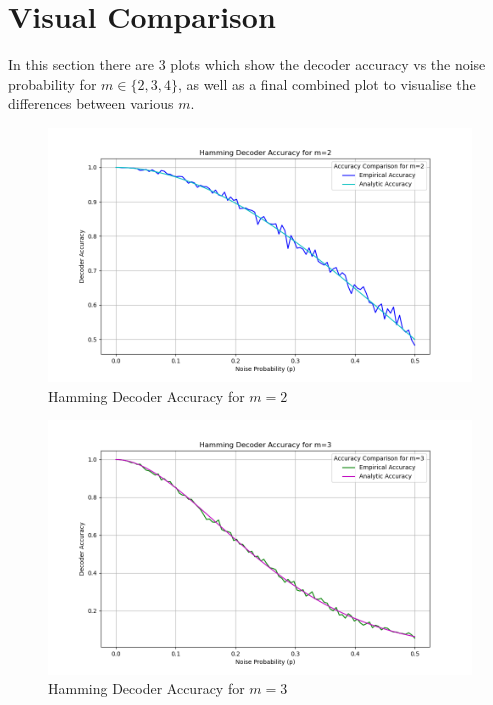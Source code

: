 \documentclass[fleqn]{article}
\begin{document}
  \section{Visual Comparison}
  In this section there are 3 plots which show the decoder accuracy vs the noise probability for $m \in \{ 2, 3, 4 \}$, as well as a final combined plot to visualise the differences between various $m$.
  \begin{figure}[ht!]
      \centering
      \includegraphics[width=1.0\textwidth]{../images/accuracy_m2.png}
      \caption{Hamming Decoder Accuracy for $m=2$}
      \label{fig:accuracy_m2}
  \end{figure}

  \begin{figure}[ht!]
      \centering
      \includegraphics[width=1.0\textwidth]{../images/accuracy_m3.png}
      \caption{Hamming Decoder Accuracy for $m=3$}
      \label{fig:accuracy_m3}
  \end{figure}
  
\end{document}
